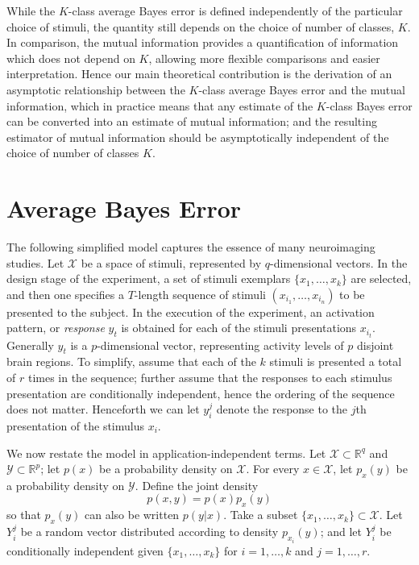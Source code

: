 \documentclass[12pt]{article}
\begin{document}
While the $K$-class average Bayes error is defined independently of the particular choice of stimuli,
the quantity still depends on the choice of number of classes, $K$.
In comparison, the mutual information provides a quantification of information which does not depend on $K$,
allowing more flexible comparisons and easier interpretation.
Hence our main theoretical contribution is the derivation of an asymptotic relationship between the $K$-class average Bayes error
and the mutual information, which in practice means that any estimate of the $K$-class Bayes error can be converted into an estimate of mutual information;
and the resulting estimator of mutual information should be asymptotically independent of the choice of number of classes $K$.

\section{Average Bayes Error}

The following simplified model captures the essence of many neuroimaging studies.
Let $\mathcal{X}$ be a space of stimuli, represented by $q$-dimensional vectors.
In the design stage of the experiment, a set of stimuli exemplars $\{x_1,\hdots, x_k\}$ are selected,
and then one specifies a $T$-length sequence of stimuli $( x_{i_1},\hdots, x_{i_n} )$ to be presented to the subject.
In the execution of the experiment, an activation pattern, or \emph{response} $y_t$ is obtained for each of the stimuli presentations $x_{i_t}$.
Generally $y_t$ is a $p$-dimensional vector, representing activity levels of $p$ disjoint brain regions.
To simplify, assume that each of the $k$ stimuli is presented a total of $r$ times in the sequence;
further assume that the responses to each stimulus presentation are conditionally independent, hence the ordering of the sequence does not matter.
Henceforth we can let $y_i^j$ denote the response to the $j$th presentation of the stimulus $x_i$.

We now restate the model in application-independent terms.  Let $\mathcal{X} \subset \mathbb{R}^q$ and $\mathcal{Y} \subset \mathbb{R}^p$;
let $p(x)$ be a probability density on $\mathcal{X}$.  For every $x \in \mathcal{X}$, let $p_x(y)$ be a probability density on $\mathcal{Y}$.
Define the joint density
\[
p(x, y) = p(x) p_x(y)
\]
so that $p_x(y)$ can also be written $p(y|x)$.
Take a  subset $\{x_1,\hdots, x_k\} \subset \mathcal{X}$.  Let $Y_i^j$ be a random vector distributed according to density $p_{x_i}(y)$;
and let $Y_i^j$ be conditionally independent given $\{x_1,\hdots, x_k\}$ for $i = 1,\hdots, k$ and $j = 1, \hdots, r.$
 
\end{document}
